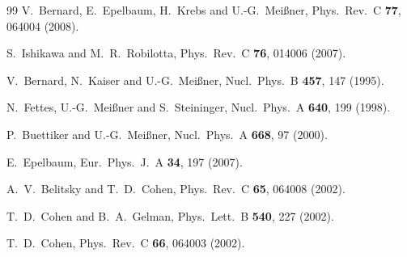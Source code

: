 \documentclass[aps,rmp,nofootinbib,twocolumn,floatfix]{revtex4}
\begin{document}
\begin{thebibliography}{99}
  V.~Bernard, E.~Epelbaum, H.~Krebs and U.-G.~Mei\ss ner,
  Phys.\ Rev.\  C {\bf 77}, 064004 (2008).

  S.~Ishikawa and M.~R.~Robilotta,
  Phys.\ Rev.\  C {\bf 76}, 014006 (2007).


  V.~Bernard, N.~Kaiser and U.-G.~Mei\ss ner,
  Nucl.\ Phys.\  B {\bf 457}, 147 (1995).

  N.~Fettes, U.-G.~Mei\ss ner and S.~Steininger,
  Nucl.\ Phys.\  A {\bf 640}, 199 (1998).

  P.~Buettiker and U.-G.~Mei\ss ner,
  Nucl.\ Phys.\  A {\bf 668}, 97 (2000).

  E.~Epelbaum,
  Eur.\ Phys.\ J.\  A {\bf 34}, 197 (2007).

  A.~V.~Belitsky and T.~D.~Cohen,
  Phys.\ Rev.\  C {\bf 65}, 064008 (2002).

  T.~D.~Cohen and B.~A.~Gelman,
  Phys.\ Lett.\  B {\bf 540}, 227 (2002).

  T.~D.~Cohen,
  Phys.\ Rev.\  C {\bf 66}, 064003 (2002).



\end{thebibliography}
\end{document}
